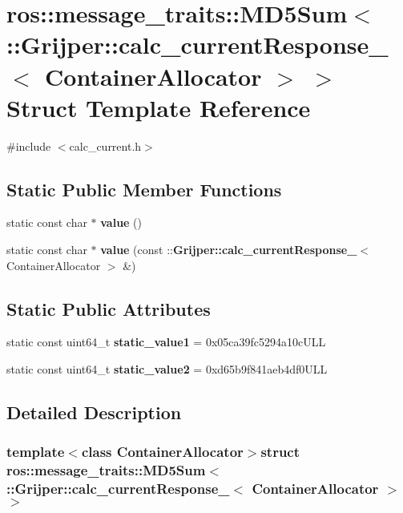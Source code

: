 \section{ros\-:\-:message\-\_\-traits\-:\-:M\-D5\-Sum$<$ \-:\-:Grijper\-:\-:calc\-\_\-current\-Response\-\_\-$<$ Container\-Allocator $>$ $>$ Struct Template Reference}
\label{structros_1_1message__traits_1_1MD5Sum_3_01_1_1Grijper_1_1calc__currentResponse___3_01ContainerAllocator_01_4_01_4}


{\ttfamily \#include $<$calc\-\_\-current.\-h$>$}

\subsection*{Static Public Member Functions}
\begin{DoxyCompactItemize}
\item 
static const char $\ast$ {\bf value} ()
\item 
static const char $\ast$ {\bf value} (const \-::{\bf Grijper\-::calc\-\_\-current\-Response\-\_\-}$<$ Container\-Allocator $>$ \&)
\end{DoxyCompactItemize}
\subsection*{Static Public Attributes}
\begin{DoxyCompactItemize}
\item 
static const uint64\-\_\-t {\bf static\-\_\-value1} = 0x05ca39fc5294a10c\-U\-L\-L
\item 
static const uint64\-\_\-t {\bf static\-\_\-value2} = 0xd65b9f841aeb4df0\-U\-L\-L
\end{DoxyCompactItemize}


\subsection{Detailed Description}
\subsubsection*{template$<$class Container\-Allocator$>$struct ros\-::message\-\_\-traits\-::\-M\-D5\-Sum$<$ \-::\-Grijper\-::calc\-\_\-current\-Response\-\_\-$<$ Container\-Allocator $>$ $>$}



